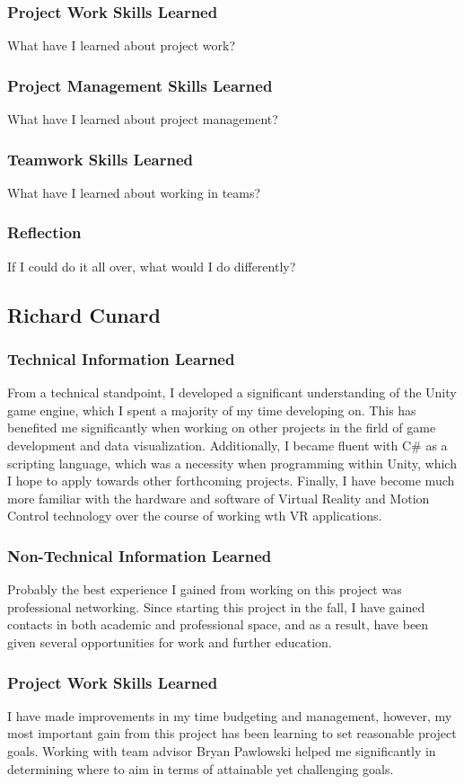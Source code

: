 \documentclass[onecolumn, draftclsnofoot,10pt, compsoc]{IEEEtran}
\begin{document}
\subsubsection{Project Work Skills Learned}
What have I learned about project work?
\subsubsection{Project Management Skills Learned}
What have I learned about project management?
\subsubsection{Teamwork Skills Learned}
What have I learned about working in teams?
\subsubsection{Reflection}
If I could do it all over, what would I do differently?


\subsection{Richard Cunard}

\subsubsection{Technical Information Learned}
From a technical standpoint, I developed a significant understanding of the Unity game engine, which I spent a majority of my time developing on. This has benefited me significantly when working on other projects in the firld of game development and data visualization. Additionally, I became fluent with C\# as a scripting language, which was a necessity when programming within Unity, which I hope to apply towards other forthcoming projects. Finally, I have become much more familiar with the hardware and software of Virtual Reality and Motion Control technology over the course of working wth VR applications.
\subsubsection{Non-Technical Information Learned}
Probably the best experience I gained from working on this project was professional networking. Since starting this project in the fall, I have gained contacts in both academic and professional space, and as a result, have been given several opportunities for work and further education.
\subsubsection{Project Work Skills Learned}
I have made improvements in my time budgeting and management, however, my most important gain from this project has been learning to set reasonable project goals. Working with team advisor Bryan Pawlowski helped me significantly in determining where to aim in terms of attainable yet challenging goals.
\end{document}
